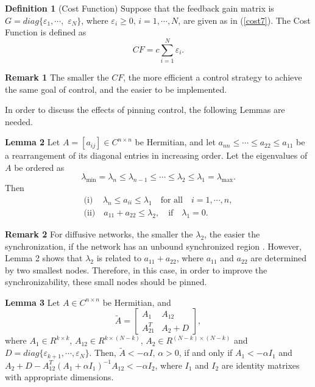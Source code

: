 \documentclass[11pt]{article}
\def\dref#1{(\ref{#1})}
\begin{document}
\textbf {Definition 1} (Cost Function) Suppose that the feedback
gain matrix is $G=diag\{\varepsilon_1,\cdots,$ $\varepsilon_N\}$,
where $\varepsilon_i\geq0,\,i=1,\cdots,N$, are given as in
\dref{cost7}. The Cost Function is defined as
$$CF=c\sum_{i=1}^{N} \varepsilon_i.$$

\textbf {Remark 1} The smaller the $CF$, the more efficient a
control strategy to achieve the same goal of control, and the easier
to be implemented.

In order to discuss the effects of pinning control, the following
Lemmas are needed.

\textbf {Lemma 2} \cite{horn85} Let $A=[a_{ij}]\in C^{n\times n}$ be
Hermitian, and let $a_{nn}\leq\cdots\leq a_{22}\leq a_{11}$ be a
rearrangement of its diagonal entries in increasing order. Let the
eigenvalues of $A$ be ordered as
\begin{equation} \label{cost4}
\lambda_{\min}=\lambda_n\leq\lambda_{n-1}\leq\cdots\leq\lambda_2\leq\lambda_1=\lambda_{\max}.
\end{equation}
Then
$$\begin{array}{l}
\textrm{(i)}\quad\, \lambda_n\leq a_{ii}\leq\lambda_1 \quad
\textrm{for
all} \quad i=1,\cdots,n,\\
\textrm{(ii)}\quad a_{11}+a_{22}\leq \lambda_2,
\quad\textrm{if}\quad \lambda_1=0.
\end{array}
$$

\textbf {Remark 2} For diffusive networks, the smaller the
$\lambda_2$, the easier the synchronization, if the network has an
unbound synchronized region \cite{jia52}. However, Lemma 2 shows
that $\lambda_2$ is related to $a_{11}+a_{22}$, where $a_{11}$ and
$a_{22}$ are determined by two smallest nodes. Therefore, in this
case, in order to improve the synchronizability, these small nodes
should be pinned.

\textbf {Lemma 3} Let $A\in C^{n\times n}$ be Hermitian, and
$$ \label{syn4}
 \tilde{A}=\left[\begin{array}{cc}
 A_1  &  A_{12}  \\
 A_{21}^T    &  A_2+D
\end{array}\right],
$$
where $A_1\in R^{k\times k}$, $A_{12}\in R^{k\times(N-k)}$, $A_2\in
R^{(N-k)\times(N-k)}$ and
$D=diag\{\varepsilon_{k+1},\cdots,\varepsilon_N\}$. Then,
$\tilde{A}<-\alpha I,\,\alpha>0$, if and only if $A_1<-\alpha I_1$
and $A_2+D-A_{12}^T(A_1+\alpha I_1)^{-1}A_{12}<-\alpha I_2 $, where
$I_1$ and $I_2$ are identity matrixes with appropriate dimensions.
\end{document}

